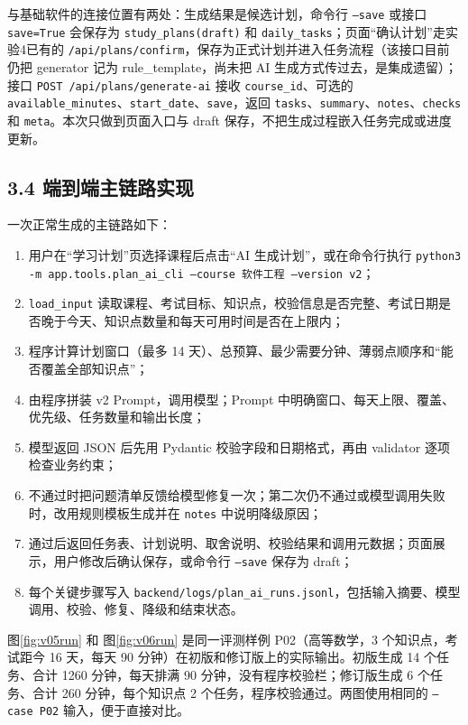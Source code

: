 \documentclass[UTF8,12pt,a4paper]{ctexart}
\begin{document}
与基础软件的连接位置有两处：生成结果是候选计划，命令行 \texttt{--save} 或接口 \texttt{save=True} 会保存为 \texttt{study\_plans(draft)} 和 \texttt{daily\_tasks}；页面“确认计划”走实验4已有的 \texttt{/api/plans/confirm}，保存为正式计划并进入任务流程（该接口目前仍把 generator 记为 rule\_template，尚未把 AI 生成方式传过去，是集成遗留）；接口 \texttt{POST /api/plans/generate-ai} 接收 \texttt{course\_id}、可选的 \texttt{available\_minutes}、\texttt{start\_date}、\texttt{save}，返回 \texttt{tasks}、\texttt{summary}、\texttt{notes}、\texttt{checks} 和 \texttt{meta}。本次只做到页面入口与 draft 保存，不把生成过程嵌入任务完成或进度更新。

\subsection*{3.4 端到端主链路实现}

一次正常生成的主链路如下：
\begin{enumerate}[leftmargin=2.4em,itemsep=0.15em]
  \item 用户在“学习计划”页选择课程后点击“AI 生成计划”，或在命令行执行 \texttt{python3 -m app.tools.plan\_ai\_cli --course 软件工程 --version v2}；
  \item \texttt{load\_input} 读取课程、考试目标、知识点，校验信息是否完整、考试日期是否晚于今天、知识点数量和每天可用时间是否在上限内；
  \item 程序计算计划窗口（最多 14 天）、总预算、最少需要分钟、薄弱点顺序和“能否覆盖全部知识点”；
  \item 由程序拼装 v2 Prompt，调用模型；Prompt 中明确窗口、每天上限、覆盖、优先级、任务数量和输出长度；
  \item 模型返回 JSON 后先用 Pydantic 校验字段和日期格式，再由 validator 逐项检查业务约束；
  \item 不通过时把问题清单反馈给模型修复一次；第二次仍不通过或模型调用失败时，改用规则模板生成并在 \texttt{notes} 中说明降级原因；
  \item 通过后返回任务表、计划说明、取舍说明、校验结果和调用元数据；页面展示，用户修改后确认保存，或命令行 \texttt{--save} 保存为 draft；
  \item 每个关键步骤写入 \texttt{backend/logs/plan\_ai\_runs.jsonl}，包括输入摘要、模型调用、校验、修复、降级和结束状态。
\end{enumerate}

图\ref{fig:v05run} 和 图\ref{fig:v06run} 是同一评测样例 P02（高等数学，3 个知识点，考试距今 16 天，每天 90 分钟）在初版和修订版上的实际输出。初版生成 14 个任务、合计 1260 分钟，每天排满 90 分钟，没有程序校验栏；修订版生成 6 个任务、合计 260 分钟，每个知识点 2 个任务，程序校验通过。两图使用相同的 \texttt{--case P02} 输入，便于直接对比。
\end{document}
